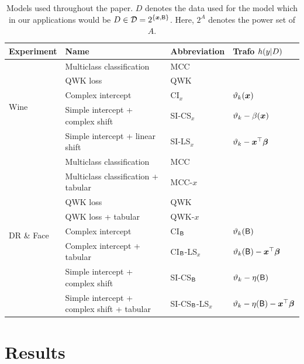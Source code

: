 \documentclass[article,nojss,shortnames]{jss}\usepackage[]{graphicx}\usepackage[]{color}
\begin{document}
\begin{table}
\centering
\caption{Models used throughout the paper. $D$ denotes the data used for the model which
in our applications would be $D \in \mathcal D = 2^{\{\boldsymbol x, \mathsf{B}\}}$.
Here, $2^A$ denotes the power set of $A$.} \label{tab:mods}
\begin{tabular}{@{}llll@{}}
\toprule
\textbf{Experiment}
& \textbf{Name}                   & \textbf{Abbreviation} & \textbf{Trafo} $h(y \rvert D)$ \\ \midrule
\multirow{5}{*}{Wine}
& Multiclass classification       & MCC                   &                \\
& QWK loss                        & QWK                   &                \\ \cline{2-4}
& Complex intercept               & CI$_x$                &  $\vartheta_k(\boldsymbol x)$ \\
& Simple intercept + complex shift& SI-CS$_x$             &  $\vartheta_k - \beta(\boldsymbol x)$ \\
& Simple intercept + linear shift & SI-LS$_x$             &  $\vartheta_k - \boldsymbol x^\top\text{\boldmath$\beta$}$ \\ \midrule
\multirow{8}{*}{DR \& Face}
& Multiclass classification       & MCC                   &                \\
& Multiclass classification + tabular& MCC-$x$            &                \\
& QWK loss                        & QWK                   &                \\
& QWK loss + tabular              & QWK-$x$               &                \\ \cline{2-4}
& Complex intercept               & CI$_{\mathsf{B}}$               & $\vartheta_k(\mathsf{B})$ \\
& Complex intercept + tabular     & CI$_{\mathsf{B}}$-LS$_x$        & $\vartheta_k(\mathsf{B}) - \boldsymbol x^\top\text{\boldmath$\beta$}$ \\
& Simple intercept + complex shift& SI-CS$_{\mathsf{B}}$            & $\vartheta_k - \eta(\mathsf{B})$ \\
& Simple intercept + complex shift + tabular& SI-CS$_{\mathsf{B}}$-LS$_x$ & $\vartheta_k - \eta(\mathsf{B}) - \boldsymbol x^\top\text{\boldmath$\beta$}$ \\ \bottomrule
\end{tabular}
\end{table}

\section{Results} \label{sec:results}
\end{document}
